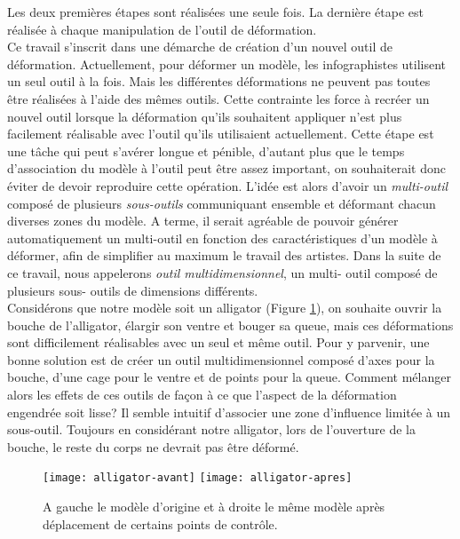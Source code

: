 Les deux premières étapes sont réalisées une seule fois. La dernière étape est
réalisée à chaque manipulation de l'outil de déformation. \\

Ce travail s'inscrit dans une démarche de création d'un nouvel outil de
déformation. Actuellement, pour déformer un modèle, les infographistes
utilisent un seul outil à la fois. Mais les différentes déformations ne
peuvent pas toutes être réalisées à l'aide des mêmes outils. Cette contrainte
les force à recréer un nouvel outil lorsque la déformation qu'ils souhaitent
appliquer n'est plus facilement réalisable avec l'outil qu'ils utilisaient
actuellement. Cette étape est une tâche qui peut s'avérer longue et pénible,
d'autant plus que le temps d'association du modèle à l'outil peut être assez
important, on souhaiterait donc éviter de devoir reproduire cette opération.
L'idée est alors d'avoir un \textit {multi-outil} composé de plusieurs \textit
{sous-outils} communiquant ensemble et déformant chacun diverses zones du
modèle. A terme, il serait agréable de pouvoir générer automatiquement un
multi-outil en fonction des caractéristiques d'un modèle à déformer, afin de
simplifier au maximum le travail des artistes. Dans la suite de ce travail,
nous appelerons \textit{outil multidimensionnel}, un multi- outil composé de
plusieurs sous- outils de dimensions différents. \\

Considérons que notre modèle soit un alligator (Figure \ref{INTall}), on
souhaite ouvrir la bouche de l'alligator, élargir son ventre et bouger sa
queue, mais ces déformations sont difficilement réalisables avec un seul et
même outil. Pour y parvenir, une bonne solution est de créer un outil
multidimensionnel composé d'axes pour la bouche, d'une cage pour le ventre et
de points pour la queue. Comment mélanger alors les effets de ces outils de
façon à ce que l'aspect de la déformation engendrée soit lisse? Il semble
intuitif d'associer une zone d'influence limitée à un sous-outil. Toujours en
considérant notre alligator, lors de l'ouverture de la bouche, le reste du
corps ne devrait pas être déformé. \\

\begin{figure}[ht]
  \texttt{[image: alligator-avant]}
  \texttt{[image: alligator-apres]}

  \caption[Explication déformation multi-outil]   {A gauche le modèle d'origine
et à droite le même modèle après déplacement de certains points de contrôle.}

  \label{INTall}
\end{figure}

